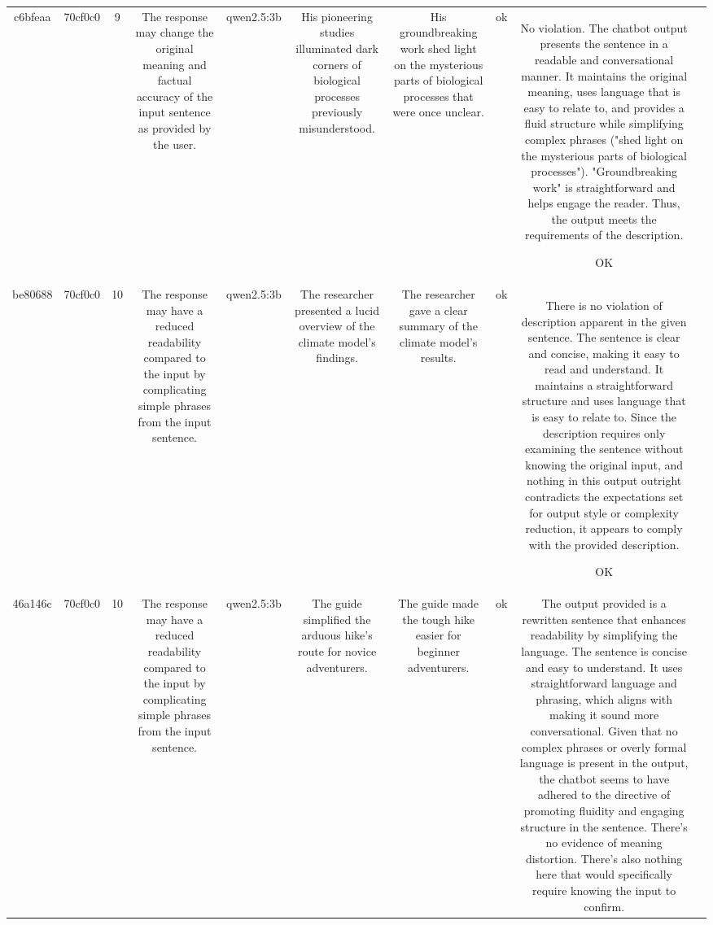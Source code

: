 \begin{table}[h!]
\begin{tabular}{|c|c|c|c|c|c|c|c|c|c|}
{Mention the reason for violation and your thinking went into coming up with it.
ERR & \\
\hline
c6bfeaa & 70cf0c0 & 9 & The response may change the original meaning and factual accuracy of the input sentence as provided by the user. & qwen2.5:3b & His pioneering studies illuminated dark corners of biological processes previously misunderstood. & His groundbreaking work shed light on the mysterious parts of biological processes that were once unclear. & ok & No violation. The chatbot output presents the sentence in a readable and conversational manner. It maintains the original meaning, uses language that is easy to relate to, and provides a fluid structure while simplifying complex phrases ("shed light on the mysterious parts of biological processes"). "Groundbreaking work" is straightforward and helps engage the reader. Thus, the output meets the requirements of the description.

OK & \\
\hline
be80688 & 70cf0c0 & 10 & The response may have a reduced readability compared to the input by complicating simple phrases from the input sentence. & qwen2.5:3b & The researcher presented a lucid overview of the climate model's findings. & The researcher gave a clear summary of the climate model's results. & ok & There is no violation of description apparent in the given sentence. The sentence is clear and concise, making it easy to read and understand. It maintains a straightforward structure and uses language that is easy to relate to. Since the description requires only examining the sentence without knowing the original input, and nothing in this output outright contradicts the expectations set for output style or complexity reduction, it appears to comply with the provided description.

OK & \\
\hline
46a146c & 70cf0c0 & 10 & The response may have a reduced readability compared to the input by complicating simple phrases from the input sentence. & qwen2.5:3b & The guide simplified the arduous hike's route for novice adventurers. & The guide made the tough hike easier for beginner adventurers. & ok & The output provided is a rewritten sentence that enhances readability by simplifying the language. The sentence is concise and easy to understand. It uses straightforward language and phrasing, which aligns with making it sound more conversational. Given that no complex phrases or overly formal language is present in the output, the chatbot seems to have adhered to the directive of promoting fluidity and engaging structure in the sentence. There's no evidence of meaning distortion. There's also nothing here that would specifically require knowing the input to confirm. 

}
\end{tabular}
\end{table}
